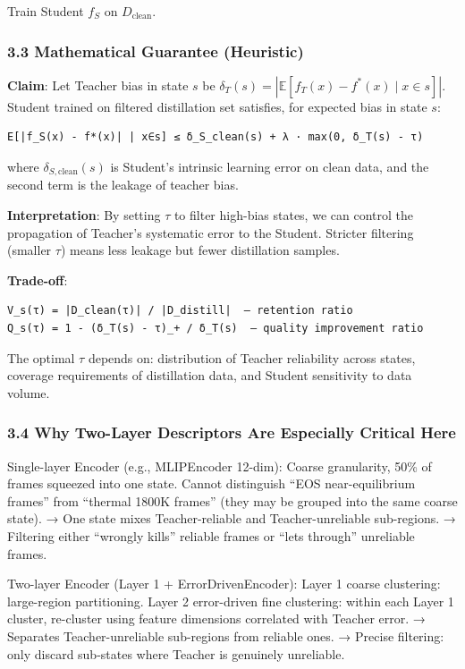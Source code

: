 \documentclass[
  12pt,
]{article}
\begin{document}
Train Student $f_S$ on $D_{\text{clean}}$.

\subsubsection{3.3 Mathematical Guarantee (Heuristic)}\label{mathematical-guarantee}

\textbf{Claim}: Let Teacher bias in state $s$ be $\delta_T(s) = |\mathbb{E}[f_T(x) - f^*(x) \mid x \in s]|$. Student trained on filtered distillation set satisfies, for expected bias in state $s$:

\begin{verbatim}
E[|f_S(x) - f*(x)| | x∈s] ≤ δ_S_clean(s) + λ · max(0, δ_T(s) - τ)
\end{verbatim}

where $\delta_{S,\text{clean}}(s)$ is Student's intrinsic learning error on clean data, and the second term is the leakage of teacher bias.

\textbf{Interpretation}: By setting $\tau$ to filter high-bias states, we can control the propagation of Teacher's systematic error to the Student. Stricter filtering (smaller $\tau$) means less leakage but fewer distillation samples.

\textbf{Trade-off}:

\begin{verbatim}
V_s(τ) = |D_clean(τ)| / |D_distill|  — retention ratio
Q_s(τ) = 1 - (δ_T(s) - τ)_+ / δ_T(s)  — quality improvement ratio
\end{verbatim}

The optimal $\tau$ depends on: distribution of Teacher reliability across states, coverage requirements of distillation data, and Student sensitivity to data volume.

\subsubsection{3.4 Why Two-Layer Descriptors Are Especially Critical Here}\label{why-two-layer-descriptors-are-critical}

Single-layer Encoder (e.g., MLIPEncoder 12-dim): Coarse granularity, 50\% of frames squeezed into one state. Cannot distinguish ``EOS near-equilibrium frames'' from ``thermal 1800K frames'' (they may be grouped into the same coarse state). → One state mixes Teacher-reliable and Teacher-unreliable sub-regions. → Filtering either ``wrongly kills'' reliable frames or ``lets through'' unreliable frames.

Two-layer Encoder (Layer 1 + ErrorDrivenEncoder): Layer 1 coarse clustering: large-region partitioning. Layer 2 error-driven fine clustering: within each Layer 1 cluster, re-cluster using feature dimensions correlated with Teacher error. → Separates Teacher-unreliable sub-regions from reliable ones. → Precise filtering: only discard sub-states where Teacher is genuinely unreliable.
\end{document}
